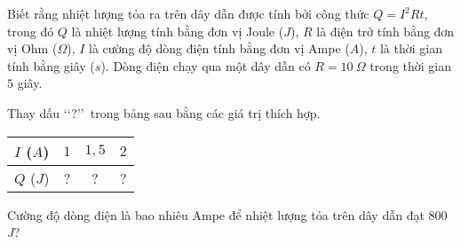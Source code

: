 \begin{bt}
	Biết rằng nhiệt lượng tỏa ra trên dây dẫn được tính bởi công thức $Q=I^2Rt$, trong đó $Q$ là nhiệt lượng tính bằng đơn vị Joule ($J$), $R$ là điện trở tính bằng đơn vị Ohm ($\Omega$), $I$ là cường độ dòng điện tính bằng đơn vị Ampe ($A$), $t$ là thời gian tính bằng giây ($s$). Dòng điện chạy qua một dây dẫn có $R=10\ \Omega$ trong thời gian $5$ giây.
	\begin{listEX}
	\item Thay dấu \lq\lq?\rq\rq\ trong bảng sau bằng các giá trị thích hợp.
	\begin{center}
	\begin{tabular}{|c|c|c|c|}
	\hline
	$I$ ($A$) & $1$ & $1{,}5$ & $2$\\
	\hline
	$Q$ ($J$) & ? & ? & ? \\
	\hline
	\end{tabular}
	\end{center}
	\item Cường độ dòng điện là bao nhiêu Ampe để nhiệt lượng tỏa trên dây dẫn đạt $800$ $J$?
	\end{listEX}
\end{bt}
